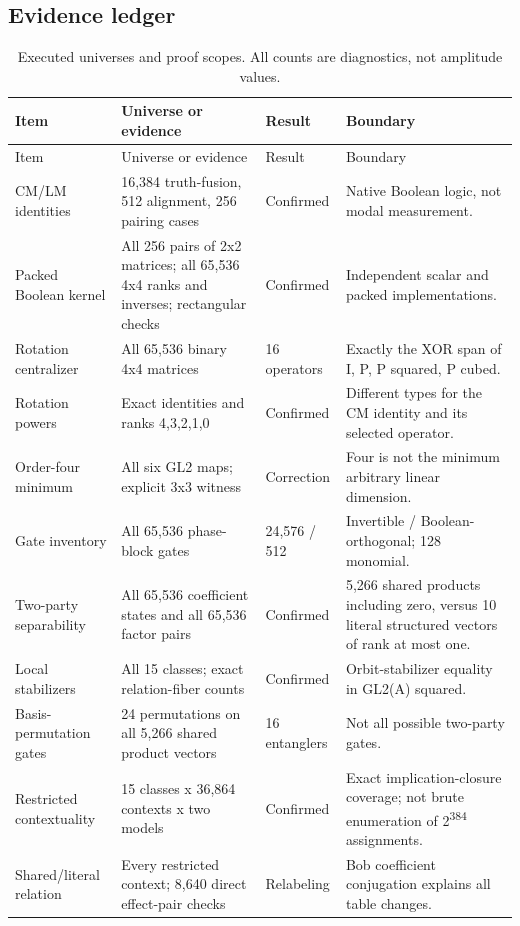 \documentclass[11pt,a4paper]{article}
\theoremstyle{definition}\newtheorem{definition}[theorem]{Definition}
\begin{document}
\subsection{Evidence ledger}
\small
\begin{longtable}{@{}L{29mm}L{53mm}L{21mm}L{45mm}@{}}
\caption{Executed universes and proof scopes. All counts are diagnostics, not amplitude values.}\\
\toprule Item & Universe or evidence & Result & Boundary\\\midrule\endfirsthead
\toprule Item & Universe or evidence & Result & Boundary\\\midrule\endhead
CM/LM identities & 16,384 truth-fusion, 512 alignment, 256 pairing cases & Confirmed & Native Boolean logic, not modal measurement.\\
Packed Boolean kernel & All 256 pairs of 2x2 matrices; all 65,536 4x4 ranks and inverses; rectangular checks & Confirmed & Independent scalar and packed implementations.\\
Rotation centralizer & All 65,536 binary 4x4 matrices & 16 operators & Exactly the XOR span of I, P, P squared, P cubed.\\
Rotation powers & Exact identities and ranks 4,3,2,1,0 & Confirmed & Different types for the CM identity and its selected operator.\\
Order-four minimum & All six GL2 maps; explicit 3x3 witness & Correction & Four is not the minimum arbitrary linear dimension.\\
Gate inventory & All 65,536 phase-block gates & 24,576 / 512 & Invertible / Boolean-orthogonal; 128 monomial.\\
Two-party separability & All 65,536 coefficient states and all 65,536 factor pairs & Confirmed & 5,266 shared products including zero, versus 10 literal structured vectors of rank at most one.\\
Local stabilizers & All 15 classes; exact relation-fiber counts & Confirmed & Orbit-stabilizer equality in GL2(A) squared.\\
Basis-permutation gates & 24 permutations on all 5,266 shared product vectors & 16 entanglers & Not all possible two-party gates.\\
Restricted contextuality & 15 classes x 36,864 contexts x two models & Confirmed & Exact implication-closure coverage; not brute enumeration of 2\textsuperscript{384} assignments.\\
Shared/literal relation & Every restricted context; 8,640 direct effect-pair checks & Relabeling & Bob coefficient conjugation explains all table changes.\\

\end{longtable}
\end{document}
